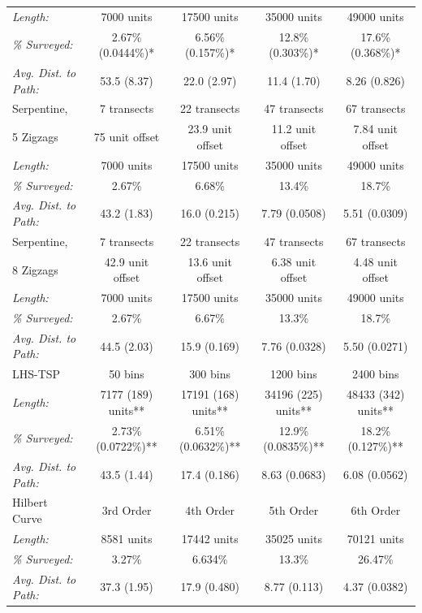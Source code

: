 \documentclass[review]{elsarticle}
\begin{document}
\begin{table}
\begin{tabular}{|l|c|c|c|c|}
\hfill\emph{Length:} & 7000 units & 17500 units & 35000 units & 49000 units \\
\hfill\emph{\% Surveyed:} & 2.67\% (0.0444\%)* & 6.56\% (0.157\%)* & 12.8\% (0.303\%)* & 17.6\% (0.368\%)* \\
\hfill\emph{Avg. Dist. to Path:} & 53.5 (8.37) & 22.0 (2.97) & 11.4 (1.70) & 8.26 (0.826) \\
\hline
Serpentine, & 7 transects & 22 transects & 47 transects & 67 transects \\
5 Zigzags & 75 unit offset & 23.9 unit offset & 11.2 unit offset & 7.84 unit offset \\
\hfill\emph{Length:} & 7000 units & 17500 units & 35000 units & 49000 units \\
\hfill\emph{\% Surveyed:} & 2.67\% & 6.68\% & 13.4\% & 18.7\% \\
\hfill\emph{Avg. Dist. to Path:} & 43.2 (1.83) & 16.0 (0.215) & 7.79 (0.0508) & 5.51 (0.0309) \\
\hline
Serpentine, & 7 transects & 22 transects & 47 transects & 67 transects \\
8 Zigzags & 42.9 unit offset & 13.6 unit offset & 6.38 unit offset & 4.48 unit offset \\
\hfill\emph{Length:} & 7000 units & 17500 units & 35000 units & 49000 units \\
\hfill\emph{\% Surveyed:} & 2.67\% & 6.67\% & 13.3\% & 18.7\% \\
\hfill\emph{Avg. Dist. to Path:} & 44.5 (2.03) & 15.9 (0.169) & 7.76 (0.0328) & 5.50 (0.0271) \\
\hline
LHS-TSP & 50 bins & 300 bins & 1200 bins & 2400 bins \\
\hfill\emph{Length:} & 7177 (189) units** & 17191 (168) units** & 34196 (225) units** & 48433 (342) units** \\
\hfill\emph{\% Surveyed:} & 2.73\% (0.0722\%)** & 6.51\% (0.0632\%)** & 12.9\% (0.0835\%)** & 18.2\% (0.127\%)** \\
\hfill\emph{Avg. Dist. to Path:} & 43.5 (1.44) & 17.4 (0.186) & 8.63 (0.0683) & 6.08 (0.0562) \\
\hline
Hilbert Curve & 3rd Order & 4th Order & 5th Order & 6th Order \\
\hfill\emph{Length:} & 8581 units & 17442 units & 35025 units & 70121 units \\
\hfill\emph{\% Surveyed:} & 3.27\% & 6.634\% & 13.3\% & 26.47\% \\
\hfill\emph{Avg. Dist. to Path:} & 37.3 (1.95) & 17.9 (0.480) & 8.77 (0.113) & 4.37 (0.0382) \\
\hline
\end{tabular}
\end{table}
\end{document}
